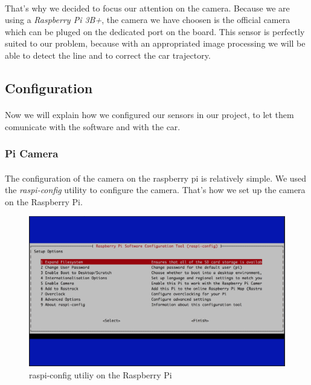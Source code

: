 \paragraph{}
That's why we decided to focus our attention on the camera. Because
we are using a \textit{Raspberry Pi 3B+}, the camera we have choosen is the official 
camera which can be pluged on the dedicated port on the board. This sensor is
perfectly suited to our problem, because with an appropriated image processing
we will be able to detect the line and to correct the car trajectory.

\subsection{Configuration}
\paragraph{}
Now we will explain how we configured our sensors in our project, to
let them comunicate with the software and with the car.

\subsubsection{Pi Camera}
\paragraph{}
The configuration of the camera on the raspberry pi is relatively simple. We
used the \textit{raspi-config} utility to configure the camera. That's how we set up
the camera on the Raspberry Pi.

\begin{figure}[!ht]
    \begin{center}
        \includegraphics[scale=0.3]{Images/Raspi_config.png}
    \end{center}
    \caption{raspi-config utiliy on the Raspberry Pi}
    \label{fig:raspi_config}
\end{figure}

